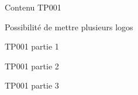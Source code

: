 \begin{TP}
    Contenu TP001
    
    Possibilité de mettre plusieurs logos
    
    TP001 partie 1
    
    
    TP001 partie 2
    
    
    TP001 partie 3 
\end{TP}